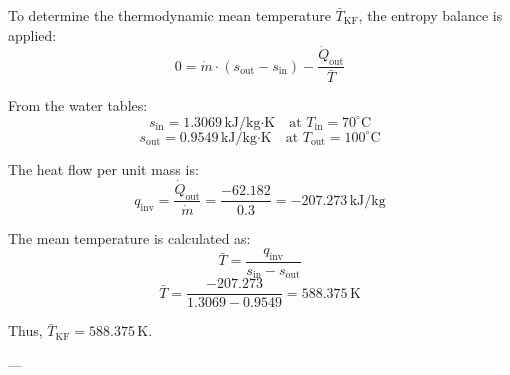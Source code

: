 To determine the thermodynamic mean temperature \( \bar{T}_{\text{KF}} \), the entropy balance is applied:  
\[
0 = \dot{m} \cdot (s_{\text{out}} - s_{\text{in}}) - \frac{\dot{Q}_{\text{out}}}{\bar{T}}
\]  

From the water tables:  
\[
s_{\text{in}} = 1.3069 \, \text{kJ/kg·K} \quad \text{at } T_{\text{in}} = 70^\circ\text{C}
\]  
\[
s_{\text{out}} = 0.9549 \, \text{kJ/kg·K} \quad \text{at } T_{\text{out}} = 100^\circ\text{C}
\]  

The heat flow per unit mass is:  
\[
q_{\text{inv}} = \frac{\dot{Q}_{\text{out}}}{\dot{m}} = \frac{-62.182}{0.3} = -207.273 \, \text{kJ/kg}
\]  

The mean temperature is calculated as:  
\[
\bar{T} = \frac{q_{\text{inv}}}{s_{\text{in}} - s_{\text{out}}}
\]  
\[
\bar{T} = \frac{-207.273}{1.3069 - 0.9549} = 588.375 \, \text{K}
\]  

Thus, \( \bar{T}_{\text{KF}} = 588.375 \, \text{K} \).  

---